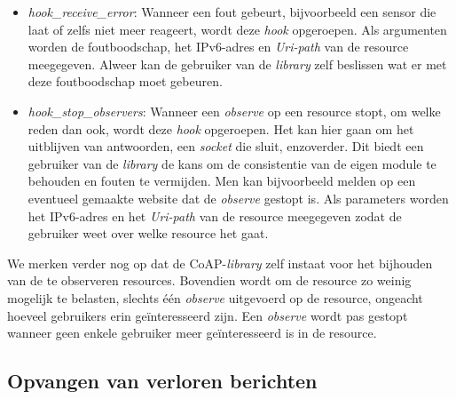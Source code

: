 \begin{itemize}
\begin{itemize}
\item \textit{hook\_receive\_error}: Wanneer een fout gebeurt, bijvoorbeeld een sensor die laat of zelfs niet meer reageert, wordt deze \textit{hook} opgeroepen. Als argumenten worden de foutboodschap, het IPv6-adres en \textit{Uri-path} van de resource meegegeven. Alweer kan de gebruiker van de \textit{library} zelf beslissen wat er met deze foutboodschap moet gebeuren.
\item \textit{hook\_stop\_observers}: Wanneer een \textit{observe} op een resource stopt, om welke reden dan ook, wordt deze \textit{hook} opgeroepen. Het kan hier gaan om het uitblijven van antwoorden, een \textit{socket} die sluit, enzoverder. Dit biedt een gebruiker van de \textit{library} de kans om de consistentie van de eigen module te behouden en fouten te vermijden. Men kan bijvoorbeeld melden op een eventueel gemaakte website dat de \textit{observe} gestopt is. Als parameters worden het IPv6-adres en het \textit{Uri-path} van de resource meegegeven zodat de gebruiker weet over welke resource het gaat.
\end{itemize}
\end{itemize}

We merken verder nog op dat de CoAP-\textit{library} zelf instaat voor het bijhouden van de te observeren resources. Bovendien wordt om de resource zo weinig mogelijk te belasten, slechts \'{e}\'{e}n \textit{observe} uitgevoerd op de resource, ongeacht hoeveel gebruikers erin ge\"{i}nteresseerd zijn. Een \textit{observe} wordt pas gestopt wanneer geen enkele gebruiker meer ge\"{i}nteresseerd is in de resource.


\subsection{Opvangen van verloren berichten} \label{exponentialBackoff}

